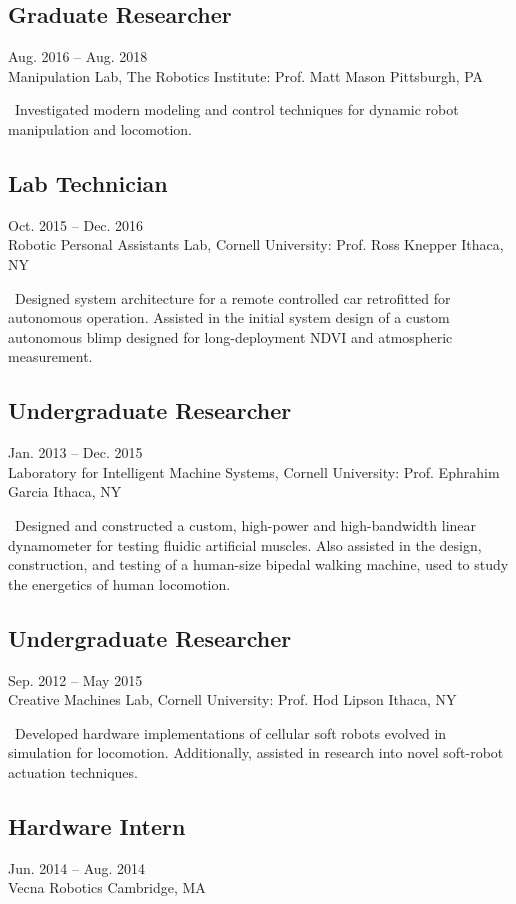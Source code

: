 \documentclass[]{article}
\begin{document}
\subsection*{Graduate Researcher} \hfill Aug. 2016 -- Aug. 2018 \\
Manipulation Lab, The Robotics Institute: Prof. Matt Mason \hfill Pittsburgh, PA

\textellipsis~Investigated modern modeling and control techniques for dynamic robot manipulation and locomotion.

\subsection*{Lab Technician} \hfill Oct. 2015 -- Dec. 2016 \\
Robotic Personal Assistants Lab, Cornell University: Prof. Ross Knepper \hfill Ithaca, NY

\textellipsis~Designed system architecture for a remote controlled car retrofitted for autonomous operation. Assisted in the initial system design of a custom autonomous blimp designed for long-deployment NDVI and atmospheric measurement.

\subsection*{Undergraduate Researcher} \hfill Jan. 2013 -- Dec. 2015 \\
Laboratory for Intelligent Machine Systems, Cornell University: Prof. Ephrahim Garcia \hfill Ithaca, NY

\textellipsis~Designed and constructed a custom, high-power and high-bandwidth linear dynamometer for testing fluidic artificial muscles. Also assisted in the design, construction, and testing of a human-size bipedal walking machine, used to study the energetics of human locomotion.

\subsection*{Undergraduate Researcher} \hfill Sep. 2012 -- May 2015 \\
Creative Machines Lab, Cornell University: Prof. Hod Lipson \hfill Ithaca, NY

\textellipsis~Developed hardware implementations of cellular soft robots evolved in simulation for locomotion. Additionally, assisted in research into novel soft-robot actuation techniques.

\subsection*{Hardware Intern} \hfill Jun. 2014 -- Aug. 2014 \\
Vecna Robotics \hfill Cambridge, MA
\end{document}
